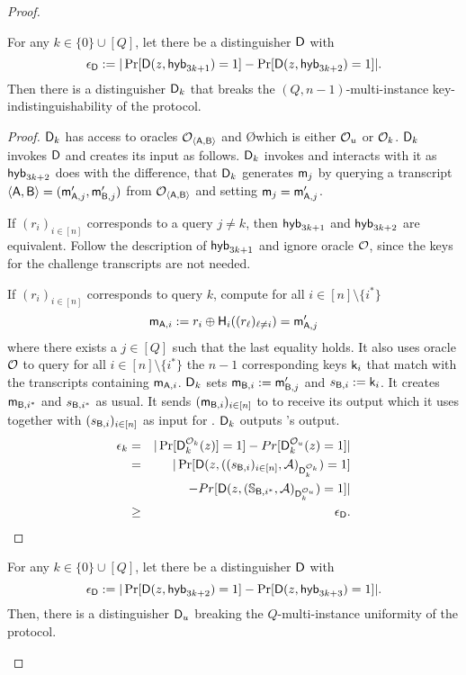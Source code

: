\begin{proof}
\begin{claim}
For any $k\in\{0\}\cup[Q]$, let there be a distinguisher $\mathsf D$ with
$$
\epsilon_{\mathsf D}:=|\Pr[\mathsf D(z,\mathsf{hyb}_{3k+1})=1] -\Pr[\mathsf D(z,\mathsf{hyb}_{3k+2})=1]|.
$$
Then there is a distinguisher $\mathsf D_k$ that breaks the $(Q,n-1)$-multi-instance key-indistinguishability of the \UKA protocol.
\end{claim}

\begin{proof}
$\mathsf D_k$ has access to oracles $\mathcal{O}_{\langle \mathsf{A},\mathsf{B}\rangle}$ and \O which is either $\mathcal{O}_u$ or $\mathcal{O}_k$. $\mathsf D_k$ invokes $\mathsf D$ and creates its input as follows. $\mathsf D_k$ invokes \Adv and interacts with it as $\mathsf{hyb}_{3k+2}$ does with the difference, that $\mathsf D_k$ generates $\mathsf{m}_j$ by querying a transcript $\langle \mathsf{A}, \mathsf{B}\rangle=(\mathsf{m}_{\mathsf{A},j}',\mathsf{m}_{\mathsf{B},j}')$ from $\mathcal{O}_{\langle \mathsf{A},\mathsf{B}\rangle}$ and setting $\mathsf{m}_j=\mathsf{m}_{\mathsf{A},j}'$. 

If $(r_i)_{i\in[n]}$ corresponds to a query $j\neq k$, then $\mathsf{hyb}_{3k+1}$ and $\mathsf{hyb}_{3k+2}$ are equivalent. Follow the description of $\mathsf{hyb}_{3k+1}$ and ignore oracle $\mathcal{O}$, since the keys for the challenge transcripts are not needed.

If $(r_i)_{i\in[n]}$ corresponds to query $k$,
compute for all $i\in[n]\setminus\{i^*\}$
$$
\mathsf{m}_{\mathsf{A},i}:=r_i\oplus\mathsf{H}_i((r_{\ell})_{\ell\neq i})=\mathsf{m}_{\mathsf{A},j}'
$$
where there exists a $j\in[Q]$ such that the last equality holds. It also uses oracle $\mathcal{O}$ to query for all $i\in[n]\setminus\{i^*\}$ the $n-1$ corresponding keys $\mathsf{k}_i$ that match with the transcripts containing $\mathsf{m}_{\mathsf{A},i}$. $\mathsf D_k$ sets $\mathsf{m}_{\mathsf{B},i}:=\mathsf{m}_{\mathsf{B},j}'$ and $s_{\mathsf{B},i}:=\mathsf{k}_i$. It creates $\mathsf{m}_{\mathsf{B},i^*}$ and $s_{\mathsf{B},i^*}$ as usual. It sends $(\mathsf{m}_{\mathsf{B},i})_{i\in[n]}$ to \Adv to receive its output which it uses together with $(s_{\mathsf{B},i})_{i\in[n]}$ as input for \D. $\mathsf D_k$ outputs \D's output.  
\begin{eqnarray*}
\epsilon_{k}&=&|\Pr[\mathsf D_k^{\mathcal{O}_{k}}(z)]=1]-Pr[\mathsf D_k^{\mathcal{O}_{u}}(z)=1]|\\
&= &|\Pr[\mathsf D(z,((s_{\mathsf{B},i})_{i\in[n]},\mathcal{A})_{\mathsf D_k^{\mathcal{O}_{k}}})=1]\\
&&-Pr[\mathsf D(z,(\mathsf{\mathbb S}_{\mathsf{B},i^*},\mathcal{A})_{\mathsf D_k^{\mathcal{O}_{u}}})=1]|\\
&\geq&\epsilon_{\mathsf D}.
\end{eqnarray*}
\pe
\end{proof}

\begin{claim}\label{claim:first}
For any $k\in\{0\}\cup[Q]$, let there be a distinguisher $\mathsf D$ with
$$
\epsilon_{\mathsf D}:=|\Pr[\mathsf D(z,\mathsf{hyb}_{3k+2})=1] -\Pr[\mathsf D(z,\mathsf{hyb}_{3k+3})=1]|.
$$
Then, there is a distinguisher $\mathsf D_u$ breaking the $Q$-multi-instance uniformity of the \UKA protocol.
\end{claim}


\end{proof}
